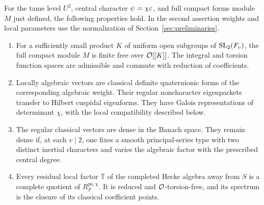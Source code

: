\begin{proposition}\label{prop:completed-forms}
For the tame level \(U^2\), central character \(\psi=\chi\varepsilon\),
and full compact forms module \(M\) just defined, the following
properties hold. In the second assertion weights and local parameters
use the normalization of Section~\ref{sec:preliminaries}.
\begin{enumerate}
\item For a sufficiently small product \(K\) of uniform open
subgroups of \(\operatorname{SL}_2(F_v)\), the full compact module \(M\)
is finite free over \(\mathcal O[[K]]\). The integral and torsion
function spaces are admissible and commute with reduction
of coefficients.
\item Locally algebraic vectors are classical definite
quaternionic forms of the corresponding algebraic weight.
Their regular noncharacter eigenpackets transfer to Hilbert
cuspidal eigenforms. They have Galois representations of
determinant \(\chi\), with the local compatibility described
below.
\item The regular classical vectors are dense in the Banach
space. They remain dense if, at each \(v\mid2\), one fixes a
smooth principal-series type with two distinct inertial
characters and varies the algebraic factor with the
prescribed central degree.
\item Every residual local factor \(\mathbb T\) of the
completed Hecke algebra away from \(S\) is a complete quotient
of \(R_F^{\mathrm{ps},\chi}\). It is reduced and
\(\mathcal O\)-torsion-free, and its spectrum is the closure of its
classical coefficient points.
\end{enumerate}
\end{proposition}
